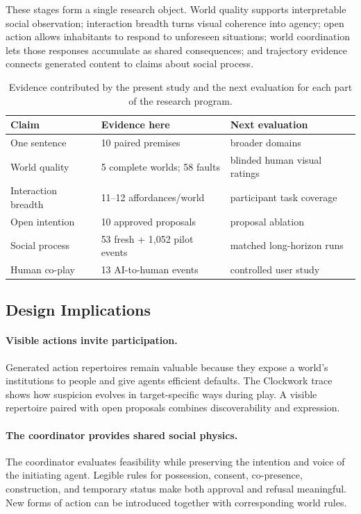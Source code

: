 \documentclass[10pt,twocolumn]{article}
\begin{document}
These stages form a single research object. World quality supports interpretable
social observation; interaction breadth turns visual coherence into agency;
open action allows inhabitants to respond to unforeseen situations; world
coordination lets those responses accumulate as shared consequences; and
trajectory evidence connects generated content to claims about social process.

\begin{table}[t]
\centering
\small
\begin{tabularx}{\columnwidth}{p{}p{}X}
\toprule
Claim & Evidence here & Next evaluation \\
\midrule
One sentence & 10 paired premises & broader domains \\
World quality & 5 complete worlds; 58 faults & blinded human visual ratings \\
Interaction breadth & 11--12 affordances/world & participant task coverage \\
Open intention & 10 approved proposals & proposal ablation \\
Social process & 53 fresh + 1,052 pilot events & matched long-horizon runs \\
Human co-play & 13 AI-to-human events & controlled user study \\
\bottomrule
\end{tabularx}
\caption{Evidence contributed by the present study and the next evaluation for
each part of the research program.}
\label{tab:claims}
\end{table}

\subsection{Design Implications}

\paragraph{Visible actions invite participation.}
Generated action repertoires remain valuable because they expose a world's
institutions to people and give agents efficient defaults. The Clockwork trace
shows how suspicion evolves in target-specific ways during play. A visible
repertoire paired with open proposals combines discoverability and expression.

\paragraph{The coordinator provides shared social physics.}
The coordinator evaluates feasibility while preserving the intention and voice
of the initiating agent. Legible rules for possession, consent, co-presence,
construction, and temporary status make both approval and refusal meaningful.
New forms of action can be introduced together with corresponding world rules.
\end{document}
